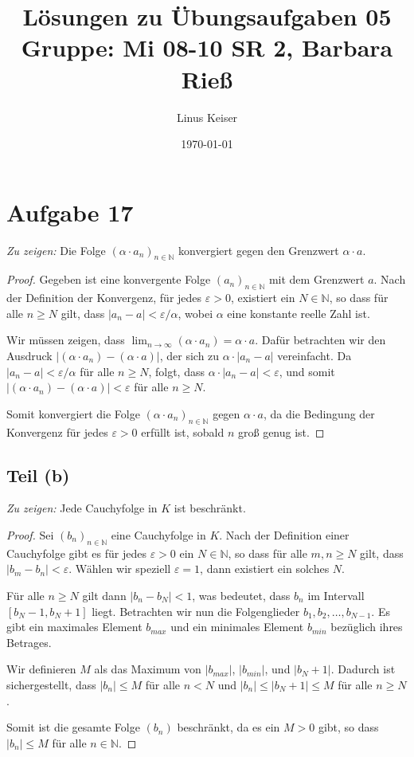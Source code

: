 \documentclass{article}
\title{Lösungen zu Übungsaufgaben 05 \\ \small Gruppe: Mi 08-10 SR 2, Barbara Rieß}
\author{Linus Keiser}
\date{\today}
\theoremstyle{definition}
\theoremstyle{remark}
\begin{document}
\maketitle

\section*{Aufgabe 17}

\textit{Zu zeigen:} Die Folge \((\alpha \cdot a_n)_{n\in\mathbb{N}}\) konvergiert gegen den Grenzwert \(\alpha \cdot a\).

\begin{proof}
	Gegeben ist eine konvergente Folge \((a_n)_{n\in\mathbb{N}}\) mit dem Grenzwert \(a\). Nach der Definition der Konvergenz, für jedes \(\varepsilon > 0\), existiert ein \(N \in \mathbb{N}\), so dass für alle \(n \geq N\) gilt, dass \(|a_n - a| < \varepsilon/\alpha\), wobei \(\alpha\) eine konstante reelle Zahl ist.

	Wir müssen zeigen, dass \(\lim_{n \to \infty} (\alpha \cdot a_n) = \alpha \cdot a\). Dafür betrachten wir den Ausdruck \(|(\alpha \cdot a_n) - (\alpha \cdot a)|\), der sich zu \(\alpha \cdot |a_n - a|\) vereinfacht. Da \(|a_n - a| < \varepsilon/\alpha\) für alle \(n \geq N\), folgt, dass \(\alpha \cdot |a_n - a| < \varepsilon\), und somit \(|(\alpha \cdot a_n) - (\alpha \cdot a)| < \varepsilon\) für alle \(n \geq N\).

	Somit konvergiert die Folge \((\alpha \cdot a_n)_{n\in\mathbb{N}}\) gegen \(\alpha \cdot a\), da die Bedingung der Konvergenz für jedes \(\varepsilon > 0\) erfüllt ist, sobald \(n\) groß genug ist.
\end{proof}

\subsection*{Teil (b)}
\textit{Zu zeigen:} Jede Cauchyfolge in \(K\) ist beschränkt.

\begin{proof}
	Sei \((b_n)_{n\in\mathbb{N}}\) eine Cauchyfolge in \(K\). Nach der Definition einer Cauchyfolge gibt es für jedes \(\varepsilon > 0\) ein \(N \in \mathbb{N}\), so dass für alle \(m, n \geq N\) gilt, dass \(|b_m - b_n| < \varepsilon\). Wählen wir speziell \(\varepsilon = 1\), dann existiert ein solches \(N\).

	Für alle \(n \geq N\) gilt dann \(|b_n - b_N| < 1\), was bedeutet, dass \(b_n\) im Intervall \([b_N - 1, b_N + 1]\) liegt. Betrachten wir nun die Folgenglieder \(b_1, b_2, \ldots, b_{N-1}\). Es gibt ein maximales Element \(b_{max}\) und ein minimales Element \(b_{min}\) bezüglich ihres Betrages.

	Wir definieren \(M\) als das Maximum von \(|b_{max}|\), \(|b_{min}|\), und \(|b_N + 1|\). Dadurch ist sichergestellt, dass \(|b_n| \leq M\) für alle \(n < N\) und \(|b_n| \leq |b_N + 1| \leq M\) für alle \(n \geq N\).

	Somit ist die gesamte Folge \((b_n)\) beschränkt, da es ein \(M > 0\) gibt, so dass \(|b_n| \leq M\) für alle \(n \in \mathbb{N}\).
\end{proof}
\end{document}
